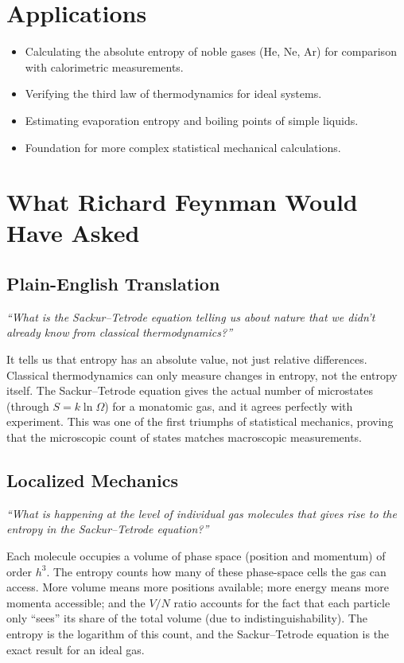 \section*{Applications}

\begin{itemize}
    \item Calculating the absolute entropy of noble gases (He, Ne, Ar) for comparison with calorimetric measurements.
    \item Verifying the third law of thermodynamics for ideal systems.
    \item Estimating evaporation entropy and boiling points of simple liquids.
    \item Foundation for more complex statistical mechanical calculations.
\end{itemize}
\section*{What Richard Feynman Would Have Asked}

\subsection*{Plain-English Translation}
\textit{``What is the Sackur--Tetrode equation telling us about nature that we didn't already know from classical thermodynamics?''}

It tells us that entropy has an absolute value, not just relative differences. Classical thermodynamics can only measure changes in entropy, not the entropy itself. The Sackur--Tetrode equation gives the actual number of microstates (through $S = k\ln\Omega$) for a monatomic gas, and it agrees perfectly with experiment. This was one of the first triumphs of statistical mechanics, proving that the microscopic count of states matches macroscopic measurements.

\subsection*{Localized Mechanics}
\textit{``What is happening at the level of individual gas molecules that gives rise to the entropy in the Sackur--Tetrode equation?''}

Each molecule occupies a volume of phase space (position and momentum) of order $h^3$. The entropy counts how many of these phase-space cells the gas can access. More volume means more positions available; more energy means more momenta accessible; and the $V/N$ ratio accounts for the fact that each particle only ``sees'' its share of the total volume (due to indistinguishability). The entropy is the logarithm of this count, and the Sackur--Tetrode equation is the exact result for an ideal gas.

